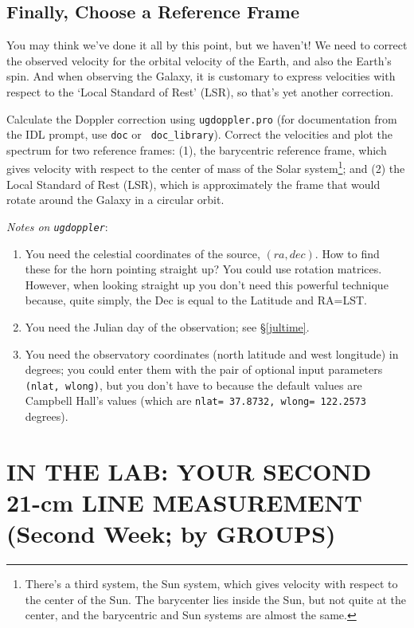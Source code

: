 \documentclass[12pt,preprint]{aastex}
\begin{document}
\subsection{Finally, Choose a Reference Frame}
You may think we've done it all by this point, but we haven't! We need
to correct the observed velocity for the orbital velocity of the Earth,
and also the Earth's spin. And when observing the Galaxy, it is
customary to express velocities with respect to the `Local Standard of
Rest' (LSR), so that's yet another correction.

Calculate the Doppler correction using {\tt ugdoppler.pro} (for
documentation from the IDL prompt, use {\tt doc} or {\tt
  doc\_library}). Correct the velocities and plot the spectrum for two
reference frames: (1), the barycentric reference frame, which gives
velocity with respect to the center of mass of the Solar
system\footnote{There's a third system, the Sun system, which gives
  velocity with respect to the center of the Sun. The barycenter lies
  inside the Sun, but not quite at the center, and the barycentric and
  Sun systems are almost the same.}; and (2) the Local Standard of Rest
(LSR), which is approximately the frame that would rotate around the
Galaxy in a circular orbit.

{\it Notes on \verb$ugdoppler$}: \begin{enumerate}

\item You need the celestial coordinates of the source, $(ra, dec)$. How
  to find these for the horn pointing straight up? You could use
  rotation matrices. However, when looking straight up you don't need
  this powerful technique because, quite simply, the Dec is equal to the
  Latitude and RA=LST.

\item You need the Julian day of the observation; see \S \ref{jultime}.

\item You need the observatory coordinates (north latitude and west
  longitude) in degrees; you could enter them with the pair of optional
  input parameters {\tt (nlat, wlong)}, but you don't have to because
  the default values are Campbell Hall's values (which are {\tt nlat=
  37.8732, wlong= 122.2573} degrees).

\end{enumerate}

\section{IN THE LAB: YOUR SECOND 21-cm LINE MEASUREMENT (Second Week; by
  GROUPS)} 
\label{meas2}
\end{document}
